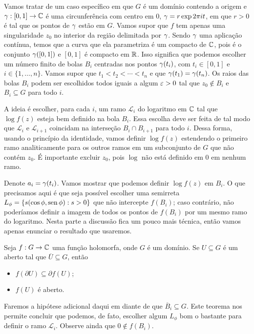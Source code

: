     Vamos tratar de um caso específico em que $G$ é um domínio contendo a origem e 
    $\gamma: [0,1] \to \mathbb{C}$ é uma circunferência com centro em $0$, $\gamma = r\exp{2 \pi i t}$, 
    em que $r > 0$ é tal que os pontos de $\gamma$ estão em $G$. 
    Vamos supor que $f$ tem apenas uma singularidade $z_0$ no interior da região delimitada por $\gamma$. 
    Sendo $\gamma$ uma aplicação contínua, temos que a curva que ela parametriza é um compacto de $\mathbb{C}$, 
    pois é o conjunto $\gamma([0,1])$ e $[0,1]$ é compacto em $\mathbb{R}$. 
    Isso significa que podemos escolher um número finito de bolas $B_i$ centradas nos pontos 
    $\gamma(t_i)$, com $t_i \in [0,1]$ e $i \in \{1,\dots, n\}$. 
    Vamos supor que $t_1 < t_2 < \cdots < t_n$ e que $\gamma(t_1) = \gamma(t_n)$.  
    Os raios das bolas $B_i$ podem ser escolhidos todos iguais a
    algum $\varepsilon > 0$ tal que $z_0 \not \in B_i$ e $B_i \subseteq G$ para todo $i$.
    
    A ideia é escolher, para cada $i$, um ramo $\mathcal{L}_i$ do logaritmo em $\mathbb{C}$ tal que 
    $\log f(z)$ esteja bem definido na bola $B_i$. Essa escolha deve ser feita de tal modo que
    $\mathcal{L}_i$ e $\mathcal{L}_{i+1}$ coincidam na interseção $B_i \cap B_{i+1}$ para todo $i$.
    Dessa forma, usando o princípio da identidade, vamos definir $\log f(z)$ estendendo o primeiro
    ramo analiticamente para os outros ramos em um subconjunto de $G$ que não contém $z_0$. 
    É importante excluir $z_0$, pois $\log$ não está definido em $0$ em nenhum ramo.
    
    Denote $a_i = \gamma(t_i)$. Vamos mostrar que podemos definir $\log f(z)$ em $B_i$. 
    O que precisamos aqui é que seja possível escolher uma semirreta 
    $L_\phi = \{s(\cos \phi, \operatorname{sen} \phi): s > 0\}$ que não intercepte $f(B_i)$; caso contrário, 
    não poderíamos definir a imagem de todos os pontos de $f(B_i)$ por um mesmo ramo do logaritmo.
    Nesta parte a discussão fica um pouco mais técnica, então vamos apenas enunciar o resultado 
    que usaremos. 
    \begin{teorema}
        Seja $f: G \to \mathbb{C}$ uma função holomorfa, onde $G$ é um domínio. 
        Se $U \subseteq G$ é um aberto tal que $\overline{U} \subseteq G$, então
        \begin{itemize}
            \item $f(\partial U) \subseteq \partial f(U)$;
            \item $f(U)$ é aberto.
        \end{itemize}
    \end{teorema}
    Faremos a hipótese adicional daqui em diante de que $\overline{B}_i \subseteq G$. 
    Este teorema nos permite concluir que podemos, de fato, escolher algum $L_\phi$ 
    bom o bastante para definir o ramo $\mathcal{L}_i$. Observe ainda que $0 \not \in f(B_i)$.
    
